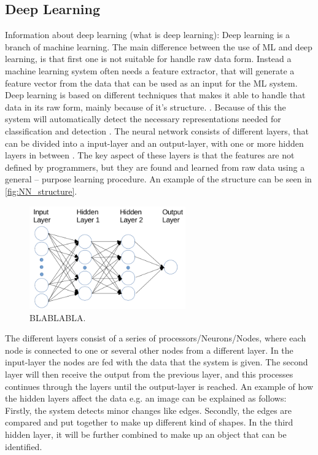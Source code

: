 \subsection{Deep Learning}

Information about deep learning (what is deep learning):
Deep learning is a branch of machine learning. The main difference between the use of ML and deep learning, is that first one is not suitable for handle raw data form. Instead a machine learning system often needs a feature extractor, that will generate a feature vector from the data that can be used as an input for the ML system. \citep{LeCun2015}
Deep learning is based on different techniques that makes it able to handle that data in its raw form, mainly because of it’s structure. \citep{LeCun2015, Schmidhuber2015}. Because of this the system will automatically detect the necessary representations needed for classification and detection \citep{LeCun2015}. The neural network consists of different layers, that can be divided into a input-layer and an output-layer, with one or more hidden layers in between \citep{LeCun2015, Schmidhuber2015}. The key aspect of these layers is that the features are not defined by programmers, but they are found and learned from raw data using a general – purpose learning procedure. \citep{LeCun2015} An example of the structure can be seen in \autoref{fig:NN_structure}.   


\begin{figure} [H]
\centering
\includegraphics[width=0.6\textwidth]{figures/NN_structure}
\caption{BLABLABLA\citep{Acquarelli2017}.}
\label{fig:NN_structure}  
\end{figure}


The different layers consist of a series of processors/Neurons/Nodes, where each node is connected to one or several other nodes from a different layer. In the input-layer the nodes are fed with the data that the system is given. The second layer will then receive the output from the previous layer, and this processes continues through the layers until the output-layer is reached. \citep{Schmidhuber2015} An example of how the hidden layers affect the data e.g. an image can be explained as follows:  
Firstly, the system detects minor changes like edges. Secondly, the edges are compared and put together to make up different kind of shapes. In the third hidden layer, it will be further combined to make up an object that can be identified. \citep{LeCun2015}

